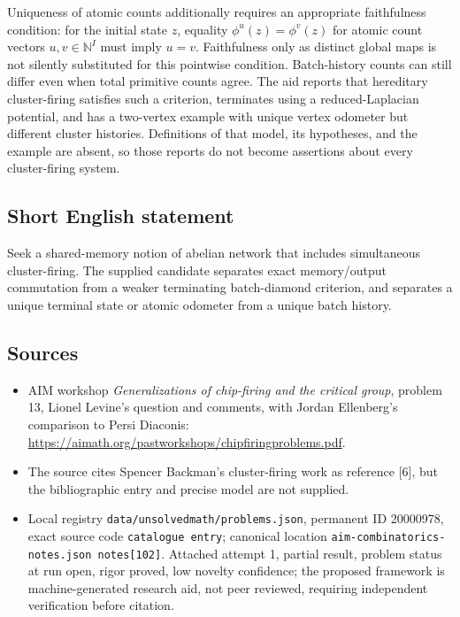 \documentclass[11pt]{article}
\newcommand{\N}{\mathbb{N}}
\begin{document}
Uniqueness of atomic counts additionally requires an appropriate faithfulness condition: for the initial state $z$, equality $\phi^u(z)=\phi^v(z)$ for atomic count vectors $u,v\in\N^I$ must imply $u=v$. Faithfulness only as distinct global maps is not silently substituted for this pointwise condition. Batch-history counts can still differ even when total primitive counts agree. The aid reports that hereditary cluster-firing satisfies such a criterion, terminates using a reduced-Laplacian potential, and has a two-vertex example with unique vertex odometer but different cluster histories. Definitions of that model, its hypotheses, and the example are absent, so those reports do not become assertions about every cluster-firing system.
\subsection{Short English statement}
Seek a shared-memory notion of abelian network that includes simultaneous cluster-firing. The supplied candidate separates exact memory/output commutation from a weaker terminating batch-diamond criterion, and separates a unique terminal state or atomic odometer from a unique batch history.
\subsection{Sources}
\begin{itemize}
\item AIM workshop \emph{Generalizations of chip-firing and the critical group}, problem 13, Lionel Levine's question and comments, with Jordan Ellenberg's comparison to Persi Diaconis: \url{https://aimath.org/pastworkshops/chipfiringproblems.pdf}.
\item The source cites Spencer Backman's cluster-firing work as reference [6], but the bibliographic entry and precise model are not supplied.
\item Local registry \texttt{data/unsolvedmath/problems.json}, permanent ID 20000978, exact source code \texttt{catalogue entry}; canonical location \texttt{aim-combinatorics-notes.json notes[102]}. Attached attempt 1, partial result, problem status at run open, rigor proved, low novelty confidence; the proposed framework is machine-generated research aid, not peer reviewed, requiring independent verification before citation.
\end{itemize}
\end{document}
